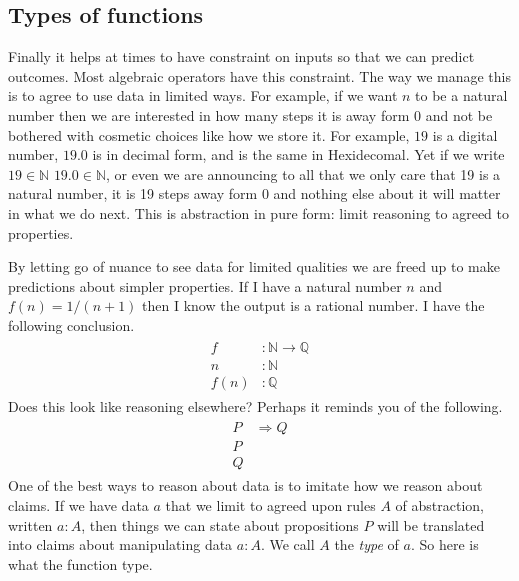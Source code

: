 
\subsection{Types of functions}

Finally it helps at times to have constraint on inputs
so that we can predict outcomes.  Most algebraic operators 
have this constraint. The way we manage this is to agree 
to use data in limited ways.  For example, if we want $n$ 
to be a natural number then we are interested in how many 
steps it is away form $0$ and not be bothered with cosmetic 
choices like how we store it.  For example,  $19$ is a digital
number, $19.0$ is in decimal form, and  is the same 
in Hexidecomal.  Yet if we write $19\in\mathbb{N}$ 
$19.0\in \mathbb{N}$, or even  we are announcing 
to all that we only care that 19 is a natural number, it is 
19 steps away form $0$ and nothing else about it will matter 
in what we do next.  This is abstraction in pure form: limit 
reasoning to agreed to properties.

By letting go of nuance to see data for limited qualities 
we are freed up to make predictions about simpler properties.
If I have a natural number $n$ and $f(n)=1/(n+1)$ then 
I know the output is a rational number.  I have the following 
conclusion.
\begin{gather*}
    \begin{array}{rl}
        f&:\mathbb{N}\to \mathbb{Q}\\
        n&:\mathbb{N}\\
    \hline 
        f(n) &:\mathbb{Q}
    \end{array}
\end{gather*} 
Does this look like reasoning elsewhere?  Perhaps it reminds 
you of the following.
\begin{gather}
    \tag{Modus Ponens}
    \begin{array}{rl}
        P &\Rightarrow Q\\
        P &\\
    \hline 
        Q
    \end{array}
\end{gather} 
One of the best ways to reason about data is to imitate 
how we reason about claims.  If we have data $a$ that we limit 
to agreed upon rules $A$ of abstraction, written $a:A$, 
then things we can state about propositions $P$ will be translated 
into claims about manipulating data $a:A$.  We call 
$A$ the \emph{type} of $a$.  So here is 
what the function type.

